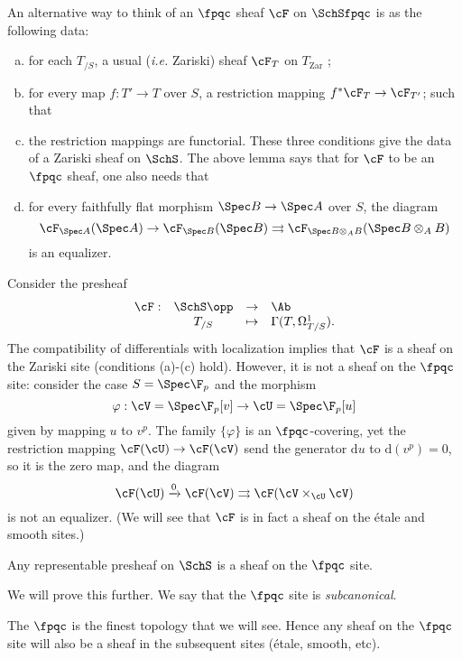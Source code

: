 An alternative way to think of an $\fpqc$ sheaf $\cF$ on $\SchSfpqc$ is as the following data:
\begin{enumerate}[(a)]
\item for each $T_{/S}$, a usual ({\it i.e.} Zariski) sheaf $\cF_T$ on $T_{\mathrm{Zar}}$ ;
\item for every map $f : T' \to T$ over $S$, a restriction mapping $f^* \cF_T \to \cF_{T'} $; such that
\item the restriction mappings are functorial. These three conditions give the data of a Zariski sheaf on $\SchS$. The above lemma says that for $\cF$ to be an $\fpqc$ sheaf, one also needs that
\item for every faithfully flat morphism $\Spec B \to \Spec A$ over $S$, the diagram 
$$
\cF_{\Spec A}(\Spec A) \to \cF_{\Spec B}(\Spec B) \rightrightarrows \cF_{\Spec B \otimes_A B}(\Spec B \otimes_A B)
$$
is an equalizer.
\end{enumerate}

\begin{example}
Consider the presheaf 
$$
\begin{array}{rccl}
\cF : & \SchS\opp & \to & \Ab \\
& T_{/S} & \mapsto & \Gamma(T, \Omega^1_{T/S}).
\end{array}
$$
The compatibility of differentials with localization implies that $\cF$ is a sheaf on the Zariski site (conditions (a)-(c) hold). However, it is not a sheaf on the $\fpqc$ site: consider the case $S = \Spec \F_p$ and the morphism 
$$
\varphi: \cV = \Spec \F_p[v] \to \cU = \Spec \F_p[u]
$$
given by mapping $u$ to $v^p$. The family $\{\varphi \}$ is an $\fpqc$-covering, yet the restriction mapping $\cF(\cU) \to \cF(\cV)$ send the generator $\mathrm{d} u$ to $\mathrm{d}(v^p) = 0$, so it is the zero map, and the diagram
$$
\cF(\cU) \xrightarrow{0} \cF(\cV) \rightrightarrows \cF(\cV \times_\cU \cV)
$$
is not an equalizer. (We will see that $\cF$ is in fact a sheaf on the \'etale and smooth sites.)
\end{example}

\begin{lem}
Any representable presheaf on $\SchS$ is a sheaf on the $\fpqc$ site.
\end{lem}

We will prove this further. We say that the $\fpqc$ site is \emph{subcanonical}.

\begin{remark}
The $\fpqc$ is the finest topology that we will see. Hence any sheaf on the $\fpqc$ site will also be a sheaf in the subsequent sites (\'etale, smooth, etc).
\end{remark}

